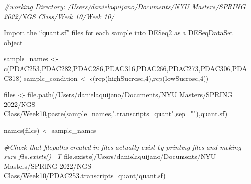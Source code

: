 \documentclass[
]{article}
\newenvironment{Shaded}{\begin{snugshade}}{\end{snugshade}}
\newcommand{\AttributeTok}[1]{\textcolor[rgb]{0.77,0.63,0.00}{#1}}
\newcommand{\CommentTok}[1]{\textcolor[rgb]{0.56,0.35,0.01}{\textit{#1}}}
\newcommand{\DecValTok}[1]{\textcolor[rgb]{0.00,0.00,0.81}{#1}}
\newcommand{\FunctionTok}[1]{\textcolor[rgb]{0.00,0.00,0.00}{#1}}
\newcommand{\NormalTok}[1]{#1}
\newcommand{\OtherTok}[1]{\textcolor[rgb]{0.56,0.35,0.01}{#1}}
\newcommand{\StringTok}[1]{\textcolor[rgb]{0.31,0.60,0.02}{#1}}
\begin{document}
\begin{Shaded}
\begin{Highlighting}[]
\CommentTok{\#working Directory: /Users/danielaquijano/Documents/NYU Masters/SPRING 2022/NGS Class/Week 10/Week 10/}
\end{Highlighting}
\end{Shaded}

Import the ``quant.sf'' files for each sample into DESeq2 as a
DESeqDataSet object.

\begin{Shaded}
\begin{Highlighting}[]
\NormalTok{sample\_names }\OtherTok{\textless{}{-}} \FunctionTok{c}\NormalTok{(}\StringTok{\textquotesingle{}PDAC253\textquotesingle{}}\NormalTok{,}\StringTok{\textquotesingle{}PDAC282\textquotesingle{}}\NormalTok{,}\StringTok{\textquotesingle{}PDAC286\textquotesingle{}}\NormalTok{,}\StringTok{\textquotesingle{}PDAC316\textquotesingle{}}\NormalTok{,}\StringTok{\textquotesingle{}PDAC266\textquotesingle{}}\NormalTok{,}\StringTok{\textquotesingle{}PDAC273\textquotesingle{}}\NormalTok{,}\StringTok{\textquotesingle{}PDAC306\textquotesingle{}}\NormalTok{,}\StringTok{\textquotesingle{}PDAC318\textquotesingle{}}\NormalTok{)}
\NormalTok{sample\_condition }\OtherTok{\textless{}{-}} \FunctionTok{c}\NormalTok{(}\FunctionTok{rep}\NormalTok{(}\StringTok{\textquotesingle{}highSucrose\textquotesingle{}}\NormalTok{,}\DecValTok{4}\NormalTok{),}\FunctionTok{rep}\NormalTok{(}\StringTok{\textquotesingle{}lowSucrose\textquotesingle{}}\NormalTok{,}\DecValTok{4}\NormalTok{))}
\end{Highlighting}
\end{Shaded}

\begin{Shaded}
\begin{Highlighting}[]
\NormalTok{files }\OtherTok{\textless{}{-}} \FunctionTok{file.path}\NormalTok{(}\StringTok{\textquotesingle{}/Users/danielaquijano/Documents/NYU Masters/SPRING 2022/NGS Class/Week10\textquotesingle{}}\NormalTok{,}\FunctionTok{paste}\NormalTok{(sample\_names,}\StringTok{".transcripts\_quant"}\NormalTok{,}\AttributeTok{sep=}\StringTok{""}\NormalTok{),}\StringTok{\textquotesingle{}quant.sf\textquotesingle{}}\NormalTok{)}

\FunctionTok{names}\NormalTok{(files) }\OtherTok{\textless{}{-}}\NormalTok{ sample\_names}
\end{Highlighting}
\end{Shaded}

\begin{Shaded}
\begin{Highlighting}[]
\CommentTok{\#Check that filepaths created in files actually exist by printing files and making sure file.exists()=T}
 \FunctionTok{file.exists}\NormalTok{(}\StringTok{\textquotesingle{}/Users/danielaquijano/Documents/NYU Masters/SPRING 2022/NGS Class/Week10/PDAC253.transcripts\_quant/quant.sf\textquotesingle{}}\NormalTok{)}
\end{Highlighting}
\end{Shaded}
\end{document}
